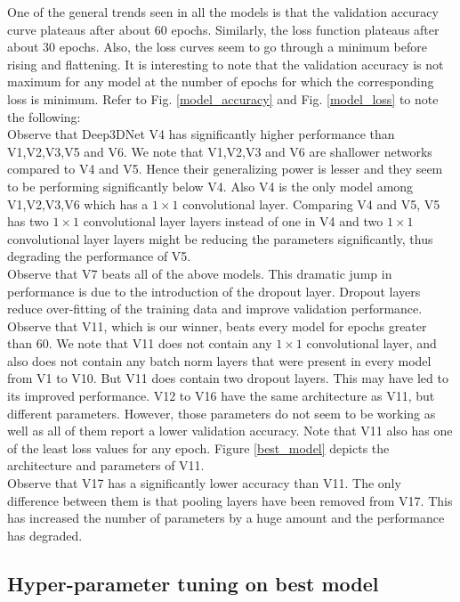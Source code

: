 \documentclass[10pt,twocolumn,letterpaper]{article}
\begin{document}
One of the general trends seen in all the models is that the validation accuracy curve plateaus after about 60 epochs. Similarly, the loss function plateaus after about 30 epochs. Also, the loss curves seem to go through a minimum before rising and flattening. It is interesting to note that the validation accuracy is not maximum for any model at the number of epochs for which the corresponding loss is minimum. Refer to Fig. \ref{model_accuracy} and Fig. \ref{model_loss} to note the following:\\ 
Observe that Deep3DNet V4 has significantly higher performance than V1,V2,V3,V5 and V6. We note that V1,V2,V3 and V6 are shallower networks compared to V4 and V5. Hence their generalizing power is lesser and they seem to be performing significantly below V4. Also V4 is the only model among V1,V2,V3,V6 which has a $1 \times 1$ convolutional layer. Comparing V4 and V5, V5 has two $1 \times 1$ convolutional layer layers instead of one in V4 and two $1 \times 1$ convolutional layer layers might be reducing the parameters significantly, thus degrading the performance of V5.\\
Observe that V7 beats all of the above models. This dramatic jump in performance is due to the introduction of the dropout layer. Dropout layers reduce over-fitting of the training data and improve validation performance.\\
Observe that V11, which is our winner, beats every model for epochs greater than 60. We note that V11 does not contain any $1 \times 1$ convolutional layer, and also does not contain any batch norm layers that were present in every model from V1 to V10. But V11 does contain two dropout layers. This may have led to its improved performance. V12 to V16 have the same architecture as V11, but different parameters. However, those parameters do not seem to be working as well as all of them report a lower validation accuracy. Note that V11 also has one of the least loss values for any epoch. Figure \ref{best_model} depicts the architecture and parameters of V11.\\ 
Observe that V17 has a significantly lower accuracy than V11. The only difference between them is that pooling layers have been removed from V17. This has increased the number of parameters by a huge amount and the performance has degraded. 

\subsection{Hyper-parameter tuning on best model}
\end{document}
